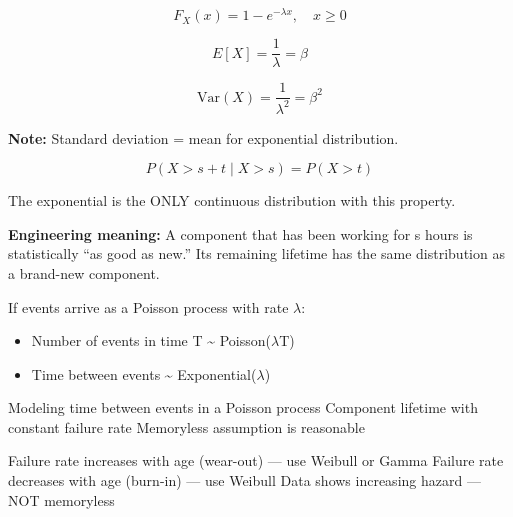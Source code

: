 
\[F_X(x) = 1 - e^{-\lambda x}, \quad x \geq 0\]


\[E[X] = \frac{1}{\lambda} = \beta\]


\[\text{Var}(X) = \frac{1}{\lambda^2} = \beta^2\]

\textbf{Note:} Standard deviation = mean for exponential distribution.


\[P(X > s + t \mid X > s) = P(X > t)\]

The exponential is the ONLY continuous distribution with this property.

\textbf{Engineering meaning:} A component that has been working for s hours is statistically ``as good as new.'' Its remaining lifetime has the same distribution as a brand-new component.


If events arrive as a Poisson process with rate \ensuremath{\lambda}:

\begin{itemize}
\tightlist
\item
  Number of events in time T \textasciitilde{} Poisson(\ensuremath{\lambda}T)
\item
  Time between events \textasciitilde{} Exponential(\ensuremath{\lambda})
\end{itemize}


\PSyes{} Modeling time between events in a Poisson process\PSbr{}\PSyes{} Component lifetime with constant failure rate\PSbr{}\PSyes{} Memoryless assumption is reasonable


\PSno{} Failure rate increases with age (wear-out) — use Weibull or Gamma\PSbr{}\PSno{} Failure rate decreases with age (burn-in) — use Weibull\PSbr{}\PSno{} Data shows increasing hazard — NOT memoryless



